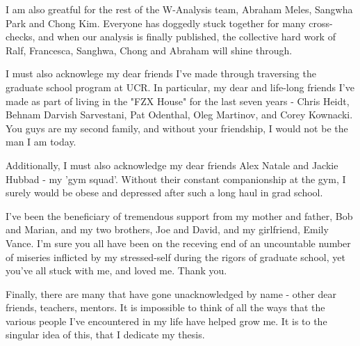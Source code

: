 I am also greatful for the rest of the W-Analysis team, Abraham Meles, Sangwha
Park and Chong Kim. Everyone has doggedly stuck together for many cross-checks,
and when our analysis is finally published, the collective hard work of Ralf,
Francesca, Sanghwa, Chong and Abraham will shine through.

I must also acknowlege my dear friends I've made through traversing the graduate
school program at UCR. In particular, my dear and life-long friends I've made as
part of living in the "FZX House" for the last seven years - Chris Heidt, Behnam
Darvish Sarvestani, Pat Odenthal, Oleg Martinov, and Corey Kownacki. You guys
are my second family, and without your friendship, I would not be the man I am
today.

Additionally, I must also acknowledge my dear friends Alex Natale and Jackie
Hubbad - my 'gym squad'. Without their constant companionship at the gym, I
surely would be obese and depressed after such a long haul in grad school.

I've been the beneficiary of tremendous support from my mother and father, Bob
and Marian, and my two brothers, Joe and David, and my girlfriend, Emily Vance.
I'm sure you all have been on the receving end of an uncountable number of
miseries inflicted by my stressed-self during the rigors of graduate school, yet
you've all stuck with me, and loved me.  Thank you.

Finally, there are many that have gone unacknowledged by name - other dear
friends, teachers, mentors. It is impossible to think of all the ways that the
various people I've encountered in my life have helped grow me. It is to the
singular idea of this, that I dedicate my thesis.
